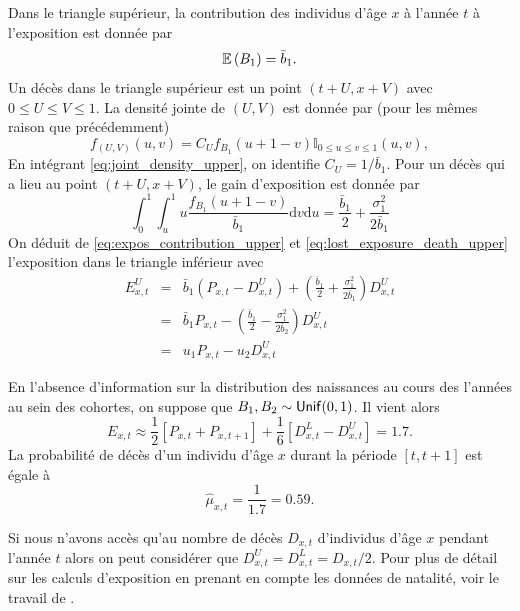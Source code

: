Dans le triangle supérieur, la contribution des individus d'âge $x$ à l'année $t$ à l'exposition  est donnée par 
\begin{equation}\label{eq:expos_contribution_upper}
\mathbb{E}\left(B_1\right)=\bar{b}_1.
\end{equation}
Un décès dans le triangle supérieur est un point $(t+U, x+ V)$ avec $0\leq U\leq V\leq 1$. La densité jointe de $(U,V)$ est donnée par (pour les mêmes raison que précédemment)
\begin{equation}\label{eq:joint_density_upper}
f_{(U,V)}(u,v) = C_U f_{B_{1}}(u+1-v)\mathbb{I}_{0\leq u\leq v\leq 1}(u,v),
\end{equation}
En intégrant \eqref{eq:joint_density_upper}, on identifie $C_U = 1/\bar{b}_{1}$. Pour un décès qui a lieu au point $(t+U, x+V)$, le gain d'exposition est donnée par 
\begin{equation}\label{eq:lost_exposure_death_upper}
\int_{0}^1\int_{u}^1u\frac{f_{B_1}(u+1-v)}{\bar{b}_1}\text{d}v\text{d}u = \frac{\bar{b}_1}{2}+\frac{\sigma_1^2}{2\bar{b}_1}
\end{equation}
On déduit de \eqref{eq:expos_contribution_upper} et \eqref{eq:lost_exposure_death_upper} l'exposition dans le triangle inférieur avec 
\begin{eqnarray*}
E^U_{x,t}&=&\bar{b}_1(P_{x,t}-D^U_{x,t}) + \left(\frac{\bar{b}_1}{2}+\frac{\sigma_1^2}{2\bar{b}_1}\right)D^U_{x,t}\\
& =& \bar{b}_1P_{x,t} - \left(\frac{\bar{b}_1}{2}-\frac{\sigma_1^2}{2\bar{b}_2}\right)D^U_{x,t}\\
&=& u_1P_{x,t} - u_2 D^U_{x,t}
\end{eqnarray*}

En l'absence d'information sur la distribution des naissances au cours des l'années au sein des cohortes, on suppose que $B_1,B_2\sim\mathsf{Unif}(0,1)$. Il vient alors
$$
E_{x,t} \approx  \frac{1}{2}[P_{x,t}+ P_{x,t+1}] + \frac{1}{6}[D^L_{x,t}- D^U_{x,t}] = 1.7.
$$
La probabilité de décès d'un individu d'âge $x$ durant la période $[t, t+1]$ est égale à 
$$
\widehat{\mu}_{x,t} = \frac{1}{1.7} = 0.59.
$$
\begin{remark}
Si nous n'avons accès qu'au nombre de décès $D_{x,t}$ d'individus d'âge $x$ pendant l'année $t$ alors on peut considérer que $D^U_{x,t} = D^L_{x,t} = D_{x,t} / 2$. Pour plus de détail sur les calculs d'exposition en prenant en compte les données de natalité, voir le travail de \citet{Boumezoued2020}.
\end{remark}
